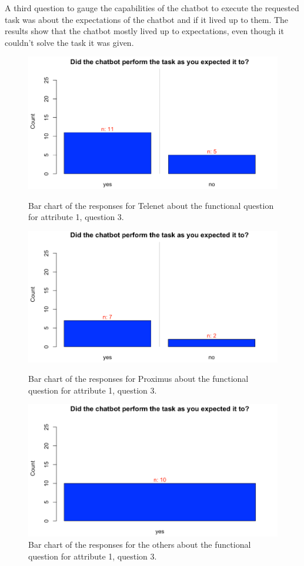 \break
A third question to gauge the capabilities of the chatbot to execute the requested task was about the expectations of the chatbot and if it lived up to them. The results show that the chatbot mostly lived up to expectations, even though it couldn't solve the task it was given.\\
\begin{figure}[!htb]
	\includegraphics[width=\linewidth]{../LaTeX/Figures/Comparative/Q1Tc.png}
	\caption{Bar chart of the responses for Telenet about the functional question for attribute 1, question 3.}\label{fig:Q1Tc}
	\endminipage\hfill
	\includegraphics[width=\linewidth]{../LaTeX/Figures/Comparative/Q1Pc.png}
	\caption{Bar chart of the responses for Proximus about the functional question for attribute 1, question 3.}\label{fig:Q1Pc}
	\endminipage\hfill
	\includegraphics[width=\linewidth]{../LaTeX/Figures/Comparative/Q1Oc.png}
	\caption{Bar chart of the responses for the others about the functional question for attribute 1, question 3.}\label{fig:Q1Oc}
	\endminipage\hfill
\end{figure}
